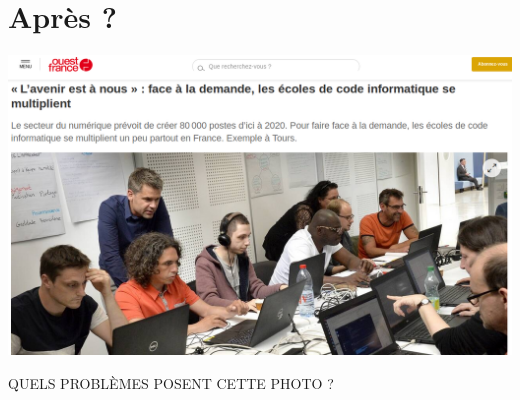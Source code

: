 \documentclass[french,handout]{beamer}
\begin{document}
\section{Après ?}

\begin{frame}
  
\begin{center}
  \includegraphics[width=\linewidth]{ouest}
\end{center}

QUELS PROBLÈMES POSENT CETTE PHOTO ?

\end{frame}
\end{document}
